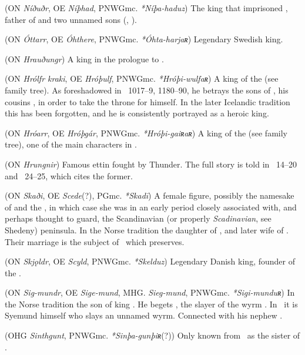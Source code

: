 \begin{itemize}
 (ON \emph{Níðuðr}, OE \emph{Níþhad}, PNWGmc. \emph{*Níþa-haduz})
  The king that imprisoned , father of  and two unnamed sons (\Volundarkvida, \Deor).

 (ON \emph{Óttarr}, OE \emph{Óhthere}, PNWGmc. \emph{*Óhta-harjaʀ})
  Legendary Swedish king.

 (ON \emph{Hrauðungr})
  A king in the prologue to \Grimnismal.

 (ON \emph{Hrólfr kraki}, OE \emph{Hróþulf}, PNWGmc. \emph{*Hróþi-wulfaʀ})
  A king of the  (see family tree). As foreshadowed in \Beowulf\ 1017–9, 1180–90, he betrays the sons of , his cousins , in order to take the throne for himself. In the later Icelandic tradition this has been forgotten, and he is consistently portrayed as a heroic king.

 (ON \emph{Hróarr}, OE \emph{Hróþgár}, PNWGmc. \emph{*Hróþi-gaiʀaʀ})
  A king of the  (see family tree), one of the main characters in \Beowulf.

 (ON \emph{Hrungnir})
  Famous ettin fought by Thunder.  The full story is told in \Haustlong\ 14–20 and \Skaldskaparmal\ 24–25, which cites the former.

 (ON \emph{Skaði}, OE \emph{Scede}(?), PGmc. \emph{*Skadī})
  A female figure, possibly the namesake of  and the , in which case she was in an early period closely associated with, and perhaps thought to guard, the Scandinavian (or properly \emph{Scadinavian}, see Shedeny) peninsula.
  In the Norse tradition the daughter of , and later wife of .  Their marriage is the subject of \Gylfaginning\ which preserves.

 (ON \emph{Skjǫldr}, OE \emph{Scyld}, PNWGmc. \emph{*Skelduz})
  Legendary Danish king, founder of the .

 (ON \emph{Sig-mundr}, OE \emph{Sige-mund}, MHG. \emph{Sieg-mund}, PNWGmc. \emph{*Sigi-munduʀ})
  In the Norse tradition the son of king .  He begets , the slayer of the wyrm .  In \Beowulf\ it is Syemund himself who slays an unnamed wyrm.  Connected with his nephew .

 (OHG \emph{Sinthgunt}, PNWGmc. \emph{*Sinþa-gunþiʀ}(?))
  Only known from \MerseburgTwo\ as the sister of .


\end{itemize}

